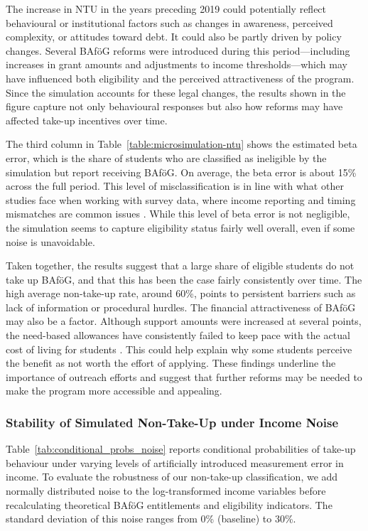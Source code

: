The increase in NTU in the years preceding 2019 could potentially reflect behavioural or institutional factors such as changes in awareness, perceived complexity, or attitudes toward debt. 
It could also be partly driven by policy changes. 
Several BAföG reforms were introduced during this period---including increases in grant amounts and adjustments to income thresholds---which may have influenced both eligibility and the perceived attractiveness of the program. 
Since the simulation accounts for these legal changes, the results shown in the figure capture not only behavioural responses but also how reforms may have affected take-up incentives over time.



The third column in Table~\ref{table:microsimulation-ntu} shows the estimated beta error, which is the share of students who are classified as ineligible by the simulation but report receiving BAföG. 
On average, the beta error is about 15\% across the full period. 
This level of misclassification is in line with what other studies face when working with survey data, where income reporting and timing mismatches are common issues \citep{frick_claim_2007}. 
While this level of beta error is not negligible, the simulation seems to capture eligibility status fairly well overall, even if some noise is unavoidable.

Taken together, the results suggest that a large share of eligible students do not take up BAföG, and that this has been the case fairly consistently over time. The high average non-take-up rate, around 60\%, points to persistent barriers such as lack of information or procedural hurdles. The financial attractiveness of BAföG may also be a factor. Although support amounts were increased at several points, the need-based allowances have consistently failed to keep pace with the actual cost of living for students \citep{staack_von_2017}. This could help explain why some students perceive the benefit as not worth the effort of applying. These findings underline the importance of outreach efforts and suggest that further reforms may be needed to make the program more accessible and appealing.


\subsubsection{Stability of Simulated Non-Take-Up under Income Noise}
Table~\ref{tab:conditional_probs_noise} reports conditional probabilities of take-up behaviour under varying levels of artificially introduced measurement error in income. 
To evaluate the robustness of our non-take-up classification, we add normally distributed noise to the log-transformed income variables before recalculating theoretical BAföG entitlements and eligibility indicators. 
The standard deviation of this noise ranges from 0\% (baseline) to 30\%.

